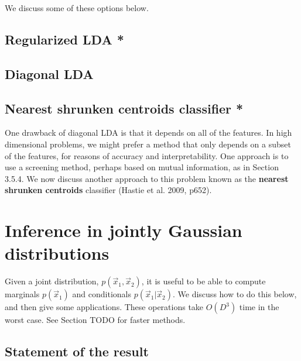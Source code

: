 We discuss some of these options below.


\subsection{Regularized LDA *}


\subsection{Diagonal LDA}


\subsection{Nearest shrunken centroids classifier *}
One drawback of diagonal LDA is that it depends on all of the features. In high dimensional problems, we might prefer a method that only depends on a subset of the features, for reasons of accuracy and interpretability. One approach is to use a screening method, perhaps based on mutual information, as in Section 3.5.4. We now discuss another approach to this problem known as the \textbf{nearest shrunken centroids} classifier (Hastie et al. 2009, p652).


\section{Inference in jointly Gaussian distributions}
Given a joint distribution, $p(\vec{x}_1,\vec{x}_2)$, it is useful to be able to compute marginals $p(\vec{x}_1)$ and conditionals $p(\vec{x}_1|\vec{x}_2)$. We discuss how to do this below, and then give some applications. These operations take $O(D^3)$ time in the worst case. See Section TODO for faster methods.


\subsection{Statement of the result}

